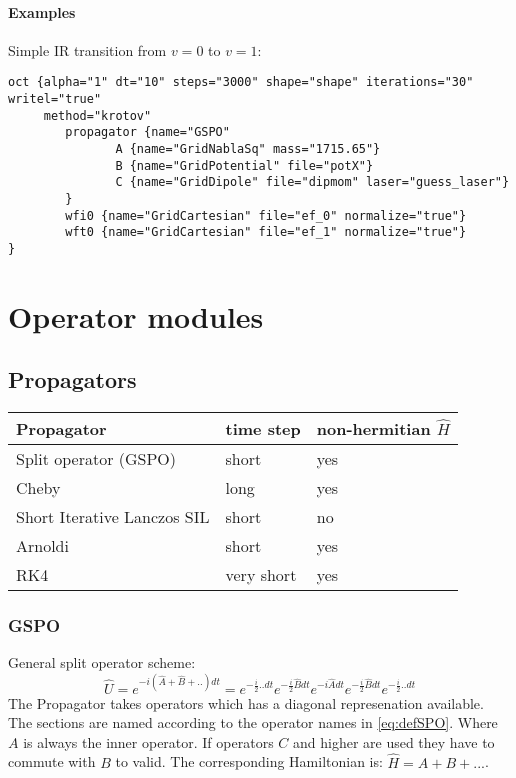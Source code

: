 \documentclass[a4paper,12pt]{scrbook}
\begin{document}
\subsubsection*{Examples}
Simple IR transition from $v=0$ to $v=1$:
\begin{verbatim}
oct {alpha="1" dt="10" steps="3000" shape="shape" iterations="30" writel="true"
     method="krotov"
        propagator {name="GSPO"
               A {name="GridNablaSq" mass="1715.65"}
               B {name="GridPotential" file="potX"}
               C {name="GridDipole" file="dipmom" laser="guess_laser"}
        }
        wfi0 {name="GridCartesian" file="ef_0" normalize="true"}
        wft0 {name="GridCartesian" file="ef_1" normalize="true"}
} 
\end{verbatim}


\chapter{Operator modules}
\section{Propagators}

\begin{center}
 \begin{tabular}{lll}
 \hline\hline
  Propagator & time step & non-hermitian $\hat H$ \\\hline
  Split operator (GSPO) & short & yes \\
  Cheby & long &  yes \\
  Short Iterative Lanczos SIL & short & no \\
  Arnoldi & short & yes \\
  RK4 & very short & yes \\\hline\hline
 \end{tabular}
\end{center}

\subsection{GSPO}
General split operator scheme:
\begin{equation}
\label{eq:defSPO}
\hat U = e^{-i(\hat A+ \hat B+..)dt} = e^{-\frac{i}{2} .. dt} e^{-\frac{i}{2} \hat B dt} e^{-i \hat A dt} e^{-\frac{i}{2} \hat B dt} e^{-\frac{i}{2} .. dt}
\end{equation}
The Propagator takes operators which has a diagonal represenation available.
The sections are named according to the operator names in \ref{eq:defSPO}. Where $A$ is always the inner operator.
If operators $C$ and higher are used they have to commute with $B$ to valid.
The corresponding Hamiltonian is: $\hat H = A + B + ...$.
\end{document}

